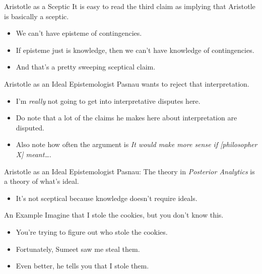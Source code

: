 \documentclass[
  17pt,
  letterpaper,
  ignorenonframetext,
  aspectratio=169,
]{beamer}
\providecommand{\tightlist}{%
  \setlength{\itemsep}{0pt}\setlength{\parskip}{0pt}}\usepackage{longtable,booktabs,array}
\begin{document}
\begin{frame}{Aristotle as a Sceptic}
\protect\hypertarget{aristotle-as-a-sceptic}{}
It is easy to read the third claim as implying that Aristotle is
basically a sceptic.

\begin{itemize}[<+->]
\tightlist
\item
  We can't have episteme of contingencies.
\item
  If episteme just is knowledge, then we can't have knowledge of
  contingencies.
\item
  And that's a pretty sweeping sceptical claim.
\end{itemize}
\end{frame}

\begin{frame}{Aristotle as an Ideal Epistemologist}
\protect\hypertarget{aristotle-as-an-ideal-epistemologist}{}
Pasnau wants to reject that interpretation.

\begin{itemize}[<+->]
\tightlist
\item
  I'm \emph{really} not going to get into interpretative disputes here.
\item
  Do note that a lot of the claims he makes here about interpretation
  are disputed.
\item
  Also note how often the argument is \emph{It would make more sense if
  {[}philosopher X{]} meant\ldots{}}.
\end{itemize}
\end{frame}

\begin{frame}{Aristotle as an Ideal Epistemologist}
\protect\hypertarget{aristotle-as-an-ideal-epistemologist-1}{}
Pasnau: The theory in \emph{Posterior Analytics} is a theory of what's
ideal.

\begin{itemize}[<+->]
\tightlist
\item
  It's not sceptical because knowledge doesn't require ideals.
\end{itemize}
\end{frame}

\begin{frame}{An Example}
\protect\hypertarget{an-example}{}
Imagine that I stole the cookies, but you don't know this.

\begin{itemize}[<+->]
\tightlist
\item
  You're trying to figure out who stole the cookies.
\item
  Fortunately, Sumeet saw me steal them.
\item
  Even better, he tells you that I stole them.
\end{itemize}
\end{frame}
\end{document}
